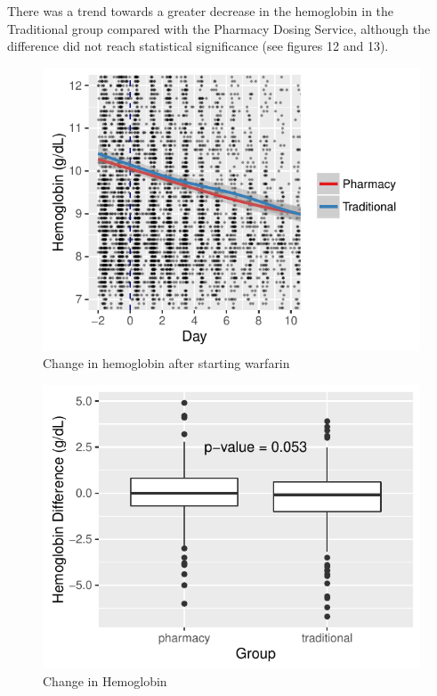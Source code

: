 \documentclass[]{article}
\begin{document}
There was a trend towards a greater decrease in the hemoglobin in the
Traditional group compared with the Pharmacy Dosing Service, although
the difference did not reach statistical significance (see figures 12
and 13).

\begin{figure}[H]
\centering
\includegraphics{warfarin_analysis_2015_files/figure-latex/hgb-1.pdf}
\caption{Change in hemoglobin after starting warfarin}
\end{figure}

\begin{figure}[H]
\centering
\includegraphics{warfarin_analysis_2015_files/figure-latex/hgb2-1.pdf}
\caption{Change in Hemoglobin}
\end{figure}
\end{document}

